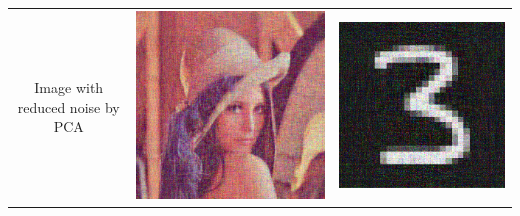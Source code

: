 \documentclass[11pt]{article}
\begin{document}
\begin{tabular}{c c c}
Image with reduced noise by PCA & \includegraphics[scale=.3]{Lenna_reduced_noise.png} & \includegraphics[scale=.3]{3_reduced_noise.png}\\
\end{tabular}
\newpage
\end{document}

